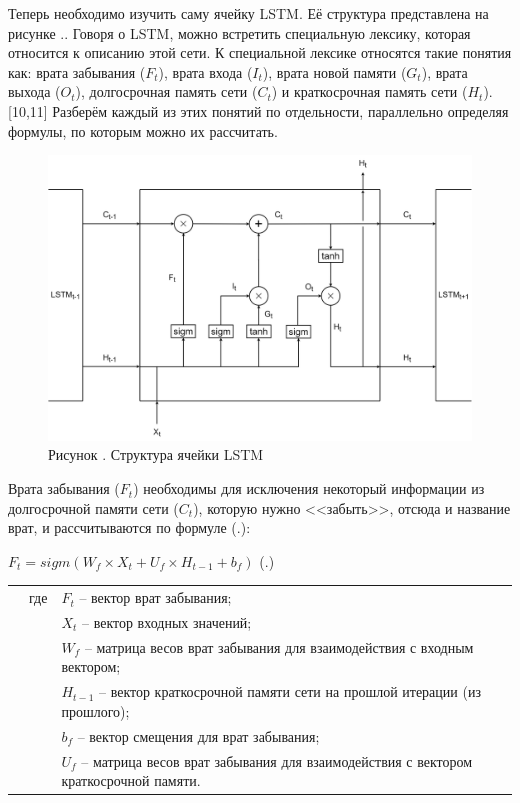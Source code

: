 {  \par \redline Теперь необходимо изучить саму ячейку LSTM. Её структура представлена на рисунке \thechaptercntr .\theimagecntr. Говоря о LSTM, можно встретить специальную лексику, которая относится к описанию этой сети. К специальной лексике относятся такие понятия как: врата забывания ($F_t$), врата входа ($I_t$), врата новой памяти ($G_t$), врата выхода ($O_t$), долгосрочная память сети ($C_t$) и краткосрочная память сети ($H_t$).[10,11] Разберём каждый из этих понятий по отдельности, параллельно определяя формулы, по которым можно их рассчитать.

  \begin{figure}
    \centering
    \def\svgwidth{\textwidth}
    \includegraphics[scale=0.225]{../GMs/Pl3/LSTM.png}
    \caption*{\gostFont Рисунок \thechaptercntr .\theimagecntr \spc {--} Структура ячейки LSTM}
    \label{fig:LSTM}
  \end{figure} \addtocounter{imagecntr}{1}

  \par \redline Врата забывания ($F_t$) необходимы для исключения некоторый информации из долгосрочной памяти сети ($C_t$), которую нужно <<забыть>>, отсюда и название врат, и рассчитываются по формуле (\thechaptercntr .\theformulacntr):

  \formulaspace \par \redline 
    $F_t = sigm(W_f \times X_t + U_f \times H_{t-1} + b_f)$
    \hfill (\thechaptercntr .\theformulacntr) \redline
  \formulaspace \addtocounter{formulacntr}{1}

  \begin{tabular}{p{}p{}p{}}
		& где  & $F_t$ {--} вектор врат забывания; \\
    & 	   & $X_t$ {--} вектор входных значений; \\
		& 	   & $W_f$ {--} матрица весов врат забывания для взаимодействия с входным вектором; \\
    & 	   & $H_{t-1}$ {--} вектор краткосрочной памяти сети на прошлой итерации (из прошлого); \\
    & 	   & $b_f$ {--} вектор смещения для врат забывания; \\
    & 	   & $U_f$ {--} матрица весов врат забывания для взаимодействия с вектором краткосрочной памяти. \\
  \end{tabular}

}
